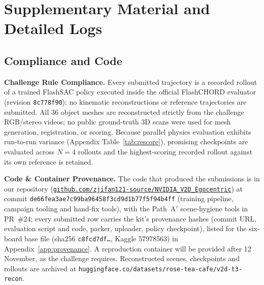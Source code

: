 \documentclass[10pt]{nvidiaextabstract}
\begin{document}
\section{Supplementary Material and Detailed Logs}
\label{sec:appendix}

\subsection{Compliance and Code}
\label{sec:compliance}
\textbf{Challenge Rule Compliance.} Every submitted trajectory is a recorded rollout of a trained FlashSAC policy executed inside the official FlashCHORD evaluator (revision \texttt{8c778f90}); no kinematic reconstructions or reference trajectories are submitted. All 36 object meshes are reconstructed strictly from the challenge RGB/stereo videos; no public ground-truth 3D scans were used for mesh generation, registration, or scoring. Because parallel physics evaluation exhibits run-to-run variance (Appendix Table~\ref{tab:rescore}), promising checkpoints are evaluated across $N=4$ rollouts and the highest-scoring recorded rollout against its own reference is retained.

\textbf{Code \& Container Provenance.} The code that produced the submissions is in our repository (\href{https://github.com/zjifan121-source/NVIDIA_V2D_Egocentric}{\texttt{github.com/\allowbreak zjifan121-source/\allowbreak NVIDIA\_V2D\_Egocentric}}) at commit \texttt{de66fea3ae7c99ba96458f3cd9d1b77f5f94b4ff} (training pipeline, campaign tooling and hand-fix tools), with the Path~A$'$ scene-hygiene tools in PR~\#24; every submitted row carries the kit's provenance hashes (commit URL, evaluation script and code, packer, uploader, policy checkpoint), listed for the six-board base file (sha256 \texttt{c8fcd7df\ldots}, Kaggle 57978563) in Appendix~\ref{app:provenance}. A reproduction container will be provided after 12 November, as the challenge requires. Reconstructed scenes, checkpoints and rollouts are archived at \texttt{huggingface.co/\allowbreak datasets/\allowbreak rose-tea-cafe/\allowbreak v2d-t3-recon}.
\end{document}
